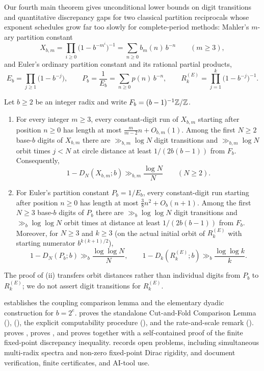 \documentclass[11pt]{article}
\begin{document}
Our fourth main theorem gives unconditional lower bounds on digit transitions and quantitative discrepancy gaps for two classical partition reciprocals whose exponent schedules grow far too slowly for complete-period methods: Mahler's $m$-ary partition constant
\[
X_{b,m}=\prod_{i\ge0}\bigl(1-b^{-m^i}\bigr)^{-1}=\sum_{n\ge0}b_m(n)\,b^{-n}\qquad(m\ge3),
\]
and Euler's ordinary partition constant and its rational partial products,
\[
E_b=\prod_{j\ge1}\bigl(1-b^{-j}\bigr),\qquad P_b=\frac{1}{E_b}=\sum_{n\ge0}p(n)\,b^{-n},\qquad R_k^{(E)}=\prod_{j=1}^k\bigl(1-b^{-j}\bigr)^{-1}.
\]

\begin{maintheorem}\label{thm:D}
Let $b\ge2$ be an integer radix and write $F_b=(b-1)^{-1}\mathbb Z/\mathbb Z$.
\begin{enumerate}[label=\textup{(\roman*)},nosep]
\item For every integer $m\ge3$, every constant-digit run of $X_{b,m}$ starting after position $n\ge0$ has length at most $\frac{m}{m-2}n+O_{b,m}(1)$. Among the first $N\ge2$ base-$b$ digits of $X_{b,m}$ there are $\gg_{b,m}\log N$ digit transitions and $\gg_{b,m}\log N$ orbit times $j<N$ at circle distance at least $1/(2b(b-1))$ from $F_b$. Consequently,
\[
1-D_N(X_{b,m};b)\gg_{b,m}\frac{\log N}{N}\qquad(N\ge2).
\]
\item For Euler's partition constant $P_b=1/E_b$, every constant-digit run starting after position $n\ge0$ has length at most $\frac38n^2+O_b(n+1)$. Among the first $N\ge3$ base-$b$ digits of $P_b$ there are $\gg_b\log\log N$ digit transitions and $\gg_b\log\log N$ orbit times at distance at least $1/(2b(b-1))$ from $F_b$. Moreover, for $N\ge3$ and $k\ge3$ (on the actual initial orbit of $R_k^{(E)}$ with starting numerator $b^{k(k+1)/2}$),
\[
1-D_N(P_b;b)\gg_b\frac{\log\log N}{N},\qquad
1-D_k(R_k^{(E)};b)\gg_b\frac{\log\log k}{k}.
\]
\end{enumerate}
\end{maintheorem}

The proof of (ii) transfers orbit distances rather than individual digits from $P_b$ to $R_k^{(E)}$; we do not assert digit transitions for $R_k^{(E)}$.

 establishes the coupling comparison lemma and the elementary dyadic construction for $b=2^e$.  proves the standalone Cut-and-Fold Comparison Lemma (),  (), the explicit computability procedure (), and the rate-and-scale remark ().  proves ,  proves , and  proves  together with a self-contained proof of the finite fixed-point discrepancy inequality.  records open problems, including simultaneous multi-radix spectra and non-zero fixed-point Dirac rigidity, and  document verification, finite certificates, and AI-tool use.
\end{document}
